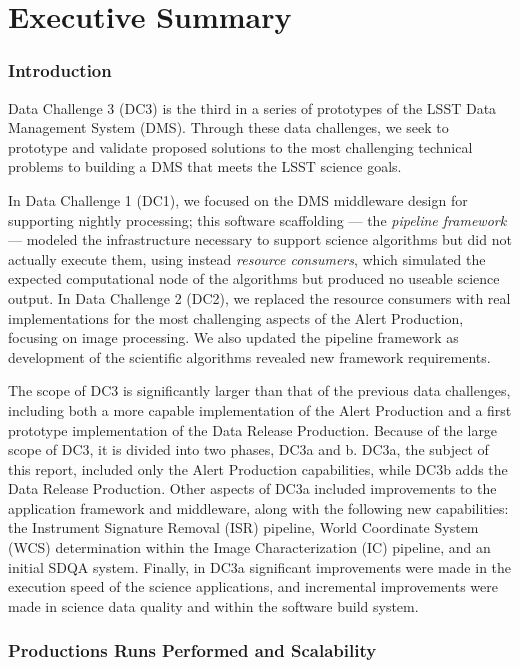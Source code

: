 \pagebreak
\section*{Executive Summary}

\subsubsection*{Introduction}

Data Challenge 3 (DC3) is the third in a series of prototypes of the
LSST Data Management System (DMS). Through these data challenges, we
seek to prototype and validate proposed solutions to the most 
challenging technical problems to building a
DMS that meets the LSST science goals.

In Data Challenge 1 (DC1), we focused on the DMS middleware design
for supporting nightly processing; this software scaffolding ---
the \textit{pipeline framework} --- modeled the infrastructure
necessary to support science algorithms but did not actually execute
them, using instead \textit{resource consumers}, which simulated the
expected computational node of the algorithms but produced no useable
science output.  In Data Challenge 2 (DC2), we replaced the resource
consumers with real implementations for the most challenging aspects of
the Alert Production, focusing on image processing. We also updated the pipeline
framework as development of the scientific algorithms revealed
new framework requirements.

The scope of DC3 is significantly larger than that of the previous
data challenges, including both a more capable implementation of the
Alert Production and a first prototype implementation of the Data
Release Production.  Because of the large scope of DC3, it is
divided into two phases, DC3a and b.  DC3a, the subject of this report, included only the Alert
Production capabilities, while DC3b adds the Data Release Production.
Other aspects of DC3a included improvements to the application framework
and middleware, along with the following new capabilities: the
Instrument Signature Removal (ISR) pipeline, World Coordinate System
(WCS) determination within the Image Characterization (IC) pipeline,
and an initial SDQA system. Finally, in DC3a significant improvements were 
made in the execution speed of the science applications,  and incremental improvements were 
made in science data quality and within the software build system.

\subsubsection*{Productions Runs Performed and Scalability}


